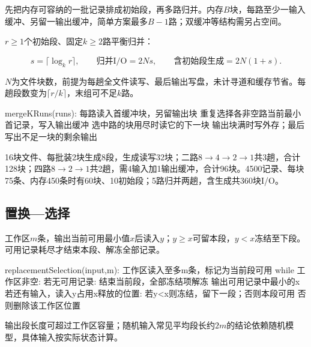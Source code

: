 先把内存可容纳的一批记录排成初始段，再多路归并。内存\(B\)块，每路至少一输入缓冲、另留一输出缓冲，简单方案最多\(B-1\)路；双缓冲等结构需另占空间。

\(r\ge1\)个初始段、固定\(k\ge2\)路平衡归并：

\[s=\lceil\log_k r\rceil,\qquad \text{归并I/O}=2Ns,\qquad \text{含初始段生成}=2N(1+s).\]

\(N\)为文件块数，前提为每趟全文件读写、最后输出写盘，未计寻道和缓存节省。每趟段数变为\(\lceil r/k\rceil\)，末组可不足\(k\)路。

\par\smallskip\noindent\begin{minipage}{\linewidth}
\begin{codeblock}[language={}]
mergeKRuns(runs):
    每路读入首缓冲块，另留输出块
    重复选择各非空路当前最小首记录，写入输出缓冲
    选中路的块用尽时读它的下一块
    输出块满时写外存；最后写出不足一块的剩余输出
\end{codeblock}
\end{minipage}\par\smallskip

16块文件、每批装2块生成8段，生成读写32块；二路\(8\to4\to2\to1\)共3趟，合计128块；四路\(8\to2\to1\)共2趟，需4输入加1输出缓冲，合计96块。4500记录、每块75条、内存450条时有60块、10初始段；5路归并两趟，含生成共360块I/O。

\subsection{置换---选择}\label{DS08-replacement}

工作区\(m\)条，输出当前可用最小值\(x\)后读入\(y\)；\(y\ge x\)可留本段，\(y<x\)冻结至下段。可用记录耗尽才结束本段、解冻全部记录。

\par\smallskip\noindent\begin{minipage}{\linewidth}
\begin{codeblock}[language={}]
replacementSelection(input,m):
    工作区读入至多m条，标记为当前段可用
    while 工作区非空:
        若无可用记录: 结束当前段，全部冻结项解冻
        输出可用记录中最小的x
        若还有输入，读入y占用x释放的位置:
            若y<x则冻结，留下一段；否则本段可用
        否则删除该工作区位置
\end{codeblock}
\end{minipage}\par\smallskip

输出段长度可超过工作区容量；随机输入常见平均段长约\(2m\)的结论依赖随机模型，具体输入按实际状态计算。

